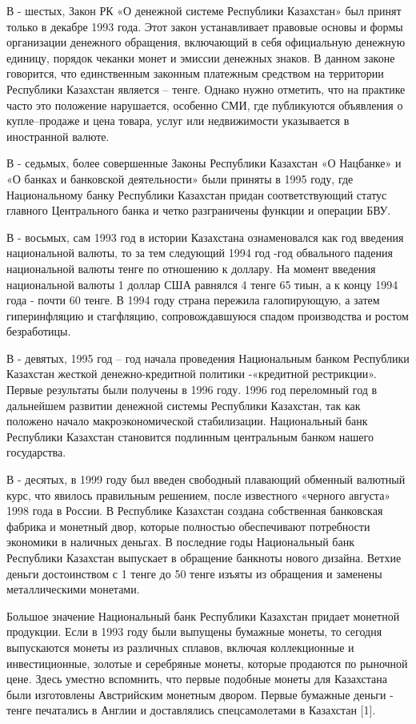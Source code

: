 \begin{multicols}{2}
В - шестых, Закон РК «О денежной системе Республики Казахстан» был
принят только в декабре 1993 года. Этот закон устанавливает правовые
основы и формы организации денежного обращения, включающий в себя
официальную денежную единицу, порядок чеканки монет и эмиссии денежных
знаков. В данном законе говорится, что единственным законным платежным
средством на территории Республики Казахстан является -- тенге. Однако
нужно отметить, что на практике часто это положение нарушается, особенно
СМИ, где публикуются объявления о купле--продаже и цена товара, услуг
или недвижимости указывается в иностранной валюте.

В - седьмых, более совершенные Законы Республики Казахстан «О Нацбанке»
и «О банках и банковской деятельности» были приняты в 1995 году, где
Национальному банку Республики Казахстан придан соответствующий статус
главного Центрального банка и четко разграничены функции и операции БВУ.

В - восьмых, сам 1993 год в истории Казахстана ознаменовался как год
введения национальной валюты, то за тем следующий 1994 год -год
обвального падения национальной валюты тенге по отношению к доллару. На
момент введения национальной валюты 1 доллар США равнялся 4 тенге 65
тиын, а к концу 1994 года - почти 60 тенге. В 1994 году страна пережила
галопирующую, а затем гиперинфляцию и стагфляцию, сопровождавшуюся
спадом производства и ростом безработицы.

В - девятых, 1995 год -- год начала проведения Национальным банком
Республики Казахстан жесткой денежно-кредитной политики -«кредитной
рестрикции». Первые результаты были получены в 1996 году. 1996 год
переломный год в дальнейшем развитии денежной системы Республики
Казахстан, так как положено начало макроэкономической стабилизации.
Национальный банк Республики Казахстан становится подлинным центральным
банком нашего государства.

В - десятых, в 1999 году был введен свободный плавающий обменный
валютный курс, что явилось правильным решением, после известного
«черного августа» 1998 года в России. В Республике Казахстан создана
собственная банковская фабрика и монетный двор, которые полностью
обеспечивают потребности экономики в наличных деньгах. В последние годы
Национальный банк Республики Казахстан выпускает в обращение банкноты
нового дизайна. Ветхие деньги достоинством с 1 тенге до 50 тенге изъяты
из обращения и заменены металлическими монетами.

Большое значение Национальный банк Республики Казахстан придает монетной
продукции. Если в 1993 году были выпущены бумажные монеты, то сегодня
выпускаются монеты из различных сплавов, включая коллекционные и
инвестиционные, золотые и серебряные монеты, которые продаются по
рыночной цене\emph{.} Здесь уместно вспомнить, что первые подобные
монеты для Казахстана были изготовлены Австрийским монетным двором.
Первые бумажные деньги - тенге печатались в Англии и доставлялись
спецсамолетами в Казахстан {[}1{]}.


\end{multicols}
